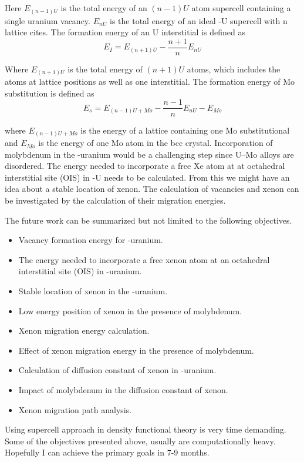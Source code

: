 Here $E_{(n-1)U}$ is the total energy of an $(n-1)U$ atom supercell containing a single uranium vacancy. $E_{nU}$ is the total energy of an ideal \textgamma-U supercell with n lattice cites. The formation energy of an U interstitial is defined as 
\begin{equation}
\label{eq_interstitial}
E_I = E_{(n+1)U} - \frac{n+1}{n} E_{nU}
\end{equation}

Where $E_{(n+1)U}$ is the total energy of $(n+1)U$ atoms, which includes the atoms at lattice positions as well as one interstitial. The formation energy of Mo substitution is defined as
\begin{equation}
E_s = E_{(n-1)U+Mo} - \frac{n-1}{n}E_{nU} - E_{Mo}
\end{equation}

where $E_{(n-1)U+Mo}$ is the energy of a lattice containing one Mo substitutional and $E_{Mo}$ is the energy of one Mo atom in the bcc crystal. Incorporation of molybdenum in the \textgamma-uranium would be a challenging step since U--Mo alloys are disordered. The energy needed to incorporate a free Xe atom at at octahedral interstitial site (OIS) in \textgamma-U needs to be calculated. From this we might have an idea about a stable location of xenon. The calculation of vacancies and xenon can be investigated by the calculation of their migration energies. 

The future work can be summarized but not limited to the following objectives.


\begin{itemize}
\item Vacancy formation energy for \textgamma-uranium.
\item The energy needed to incorporate a free xenon atom at an octahedral interstitial site (OIS) in \textgamma-uranium.
\item Stable location of xenon in the \textgamma-uranium.
\item Low energy position of xenon in the presence of molybdenum.
\item Xenon migration energy calculation.
\item Effect of xenon migration energy in the presence of molybdenum.
\item Calculation of diffusion constant of xenon in \textgamma-uranium.
\item Impact of molybdenum in the diffusion constant of xenon. 
\item Xenon migration path analysis.
\end{itemize}

Using supercell approach in density functional theory is very time demanding. Some of the objectives presented above, usually are computationally heavy. Hopefully I can achieve the primary goals in 7-9 months.






